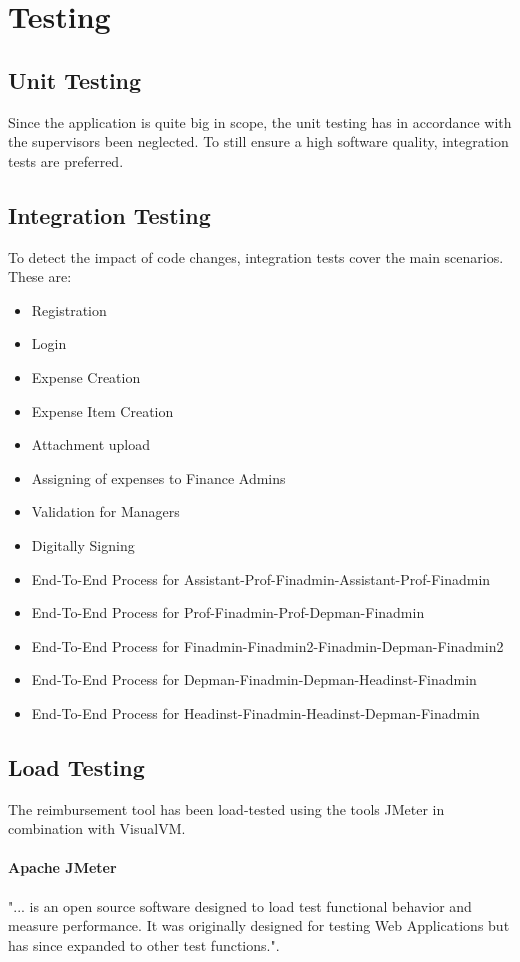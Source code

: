 \section{Testing}

\subsection{Unit Testing}
Since the application is quite big in scope, the unit testing has in accordance with the supervisors been neglected. To still ensure a high software quality, integration tests are preferred.

\subsection{Integration Testing}
To detect the impact of code changes, integration tests cover the main scenarios. These are:
\begin{itemize}
	\item Registration
	\item Login
	\item Expense Creation
	\item Expense Item Creation
	\item Attachment upload
	\item Assigning of expenses to Finance Admins
	\item Validation for Managers
	\item Digitally Signing
	\item End-To-End Process for Assistant-Prof-Finadmin-Assistant-Prof-Finadmin
	\item End-To-End Process for Prof-Finadmin-Prof-Depman-Finadmin
	\item End-To-End Process for Finadmin-Finadmin2-Finadmin-Depman-Finadmin2
	\item End-To-End Process for Depman-Finadmin-Depman-Headinst-Finadmin
	\item End-To-End Process for Headinst-Finadmin-Headinst-Depman-Finadmin
\end{itemize}


\subsection{Load Testing}
The reimbursement tool has been load-tested using the tools JMeter\cite{jmeter} in combination with VisualVM\cite{visualvm}.

\paragraph{Apache JMeter}
"... is an open source software designed to load test functional behavior and measure performance. It was originally designed for testing Web Applications but has since expanded to other test functions."\cite{jmeter}.\par

